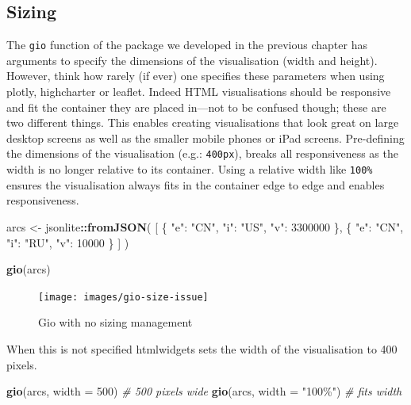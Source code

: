 \documentclass[
  10pt,
]{krantz}
\makeatletter
\newenvironment{Shaded}{\begin{snugshade}}{\end{snugshade}}
\newcommand{\CommentTok}[1]{\textcolor[rgb]{0.37,0.37,0.37}{\textit{#1}}}
\newcommand{\DataTypeTok}[1]{\textcolor[rgb]{0.27,0.27,0.27}{#1}}
\newcommand{\DecValTok}[1]{\textcolor[rgb]{0.06,0.06,0.06}{#1}}
\newcommand{\KeywordTok}[1]{\textcolor[rgb]{0.27,0.27,0.27}{\textbf{#1}}}
\newcommand{\NormalTok}[1]{#1}
\newcommand{\OperatorTok}[1]{\textcolor[rgb]{0.43,0.43,0.43}{\textbf{#1}}}
\newcommand{\StringTok}[1]{\textcolor[rgb]{0.5,0.5,0.5}{#1}}
\newenvironment{kframe}{%
\medskip{}
\setlength{\fboxsep}{.8em}
 \def\at@end@of@kframe{}%
 \ifinner\ifhmode%
  \def\at@end@of@kframe{\end{minipage}}%
  \begin{minipage}{\columnwidth}%
 \fi\fi%
 \def\FrameCommand##1{\hskip\@totalleftmargin \hskip-\fboxsep
 \colorbox{shadecolor}{##1}\hskip-\fboxsep
     \hskip-\linewidth \hskip-\@totalleftmargin \hskip\columnwidth}%
 \MakeFramed {\advance\hsize-\width
   \@totalleftmargin\z@ \linewidth\hsize
   \@setminipage}}%
 {\par\unskip\endMakeFramed%
 \at@end@of@kframe}
\renewenvironment{Shaded}{\begin{kframe}}{\end{kframe}}
\makeatother
\begin{document}
\hypertarget{widgets-adv-sizing}{%
\subsection{Sizing}\label{widgets-adv-sizing}}

The \texttt{gio} function of the package we developed in the previous chapter has arguments to specify the dimensions of the visualisation (width and height). However, think how rarely (if ever) one specifies these parameters when using plotly, highcharter or leaflet. Indeed HTML visualisations should be responsive and fit the container they are placed in---not to be confused though; these are two different things. This enables creating visualisations that look great on large desktop screens as well as the smaller mobile phones or iPad screens. Pre-defining the dimensions of the visualisation (e.g.: \texttt{400px}), breaks all responsiveness as the width is no longer relative to its container. Using a relative width like \texttt{100\%} ensures the visualisation always fits in the container edge to edge and enables responsiveness.

\begin{Shaded}
\begin{Highlighting}[]
\NormalTok{arcs <{-}}\StringTok{ }\NormalTok{jsonlite}\OperatorTok{::}\KeywordTok{fromJSON}\NormalTok{(}
  \StringTok{\textquotesingle{}[}
\StringTok{    \{}
\StringTok{      "e": "CN",}
\StringTok{      "i": "US",}
\StringTok{      "v": 3300000}
\StringTok{    \},}
\StringTok{    \{}
\StringTok{      "e": "CN",}
\StringTok{      "i": "RU",}
\StringTok{      "v": 10000}
\StringTok{    \}}
\StringTok{  ]\textquotesingle{}}
\NormalTok{)}

\KeywordTok{gio}\NormalTok{(arcs)}
\end{Highlighting}
\end{Shaded}

\begin{figure}[H]

{\centering \texttt{[image: images/gio-size-issue]} 

}

\caption{Gio with no sizing management}\label{fig:gio-size-issue}
\end{figure}

When this is not specified htmlwidgets sets the width of the visualisation to 400 pixels.

\begin{Shaded}
\begin{Highlighting}[]
\KeywordTok{gio}\NormalTok{(arcs, }\DataTypeTok{width =} \DecValTok{500}\NormalTok{) }\CommentTok{\# 500 pixels wide}
\KeywordTok{gio}\NormalTok{(arcs, }\DataTypeTok{width =} \StringTok{"100\%"}\NormalTok{) }\CommentTok{\# fits width}
\end{Highlighting}
\end{Shaded}
\end{document}
